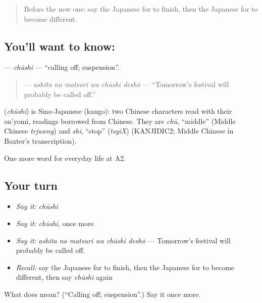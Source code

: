 \label{lesson:JA-C167-chuushi}



\begin{quote}
Before the new one: say the Japanese for to finish, then the Japanese for to become different.
\end{quote}

\subsection*{You'll want to know: }
\textbf{} — \emph{chūshi} — \textquotedblleft{}calling off; suspension\textquotedblright{}.

\begin{quote}
\textbf{  } — \emph{ashita no matsuri wa chūshi deshō} — \textquotedblleft{}Tomorrow's festival will probably be called off.\textquotedblright{}
\end{quote}

\begin{cousinweb}
\textbf{} (\emph{chūshi}) is Sino-Japanese (kango): two Chinese characters read with their on'yomi, readings borrowed from Chinese. They are \emph{chū}, \textquotedblleft{}middle\textquotedblright{} (Middle Chinese \emph{trjuwng}) and \emph{shi}, \textquotedblleft{}stop\textquotedblright{} (\emph{tsyiX}) (KANJIDIC2; Middle Chinese in Baxter's transcription).
\end{cousinweb}

\begin{grammarlens}[title={What you've built}]
One more word for everyday life at A2.
\end{grammarlens}

\subsection*{Your turn}
\begin{itemize}
\raggedright
  \item \emph{Say it:} \emph{chūshi}
  \item \emph{Say it:} \emph{chūshi}, once more
  \item \emph{Say it:} \emph{ashita no matsuri wa chūshi deshō} — Tomorrow's festival will probably be called off.
  \item \emph{Recall:} say the Japanese for to finish, then the Japanese for to become different, then say \emph{chūshi} again
\end{itemize}

\begin{tcolorbox}[breakable,colback=teal!4,colframe=teal!35!black,title={Before you move on}]
What does  mean? (\textquotedblleft{}Calling off; suspension\textquotedblright{}.) Say it once more.
\end{tcolorbox}
